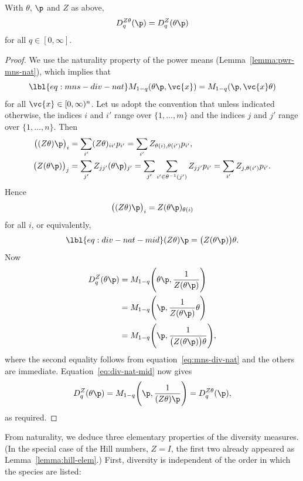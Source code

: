 \begin{lemma}[Naturality]
%
% 
With $\theta$, $\p$ and $Z$ as above,
\[
D_q^{Z\theta}(\p) = D_q^Z(\theta\p)
\]
for all $q \in [0, \infty]$.
\end{lemma}

\begin{proof}
We use the naturality property of the
power means (Lemma~\ref{lemma:pwr-mns-nat}), which implies that
% 
\begin{equation}
\lbl{eq:mns-div-nat}
M_{1 - q}(\theta\p, \vc{x})
=
M_{1 - q}(\p, \vc{x}\theta)
\end{equation}
% 
for all $\vc{x} \in [0, \infty)^n$.  Let us adopt the convention that unless
  indicated otherwise, the indices $i$ and $i'$ range over $\{1, \ldots,
  m\}$ and the indices $j$ and $j'$ range over $\{1, \ldots, n\}$.  Then
% 
\begin{align*}
\bigl( (Z\theta)\p \bigr)_i     &
=
\sum_{i'} (Z\theta)_{ii'} p_{i'} 
=
\sum_{i'} Z_{\theta(i), \theta(i')} p_{i'},     \\
\bigl( Z (\theta\p) \bigr)_j    &
=
\sum_{j'} Z_{jj'} (\theta\p)_{j'}
=
\sum_{j'} \sum_{i' \in \theta^{-1}(j')} Z_{jj'} p_{i'}
=
\sum_{i'} Z_{j, \theta(i')} p_{i'}.
\end{align*}
% 
Hence 
\[
\bigl( (Z\theta) \p \bigr)_i 
=
Z(\theta\p)_{\theta(i)}
\]
for all $i$, or equivalently,
% 
\begin{equation}
\lbl{eq:div-nat-mid}
(Z\theta) \p = \bigl( Z (\theta\p) \bigr) \theta.
\end{equation}
% 
Now
% 
\begin{align*}
D_q^Z(\theta\p) &
=
M_{1 - q}\Biggl(
\theta\p, \frac{1}{Z(\theta\p)}
\Biggr)  \\
&
=
M_{1 - q} \Biggl( 
\p, 
\frac{1}{Z(\theta\p)} \theta    
\Biggr) \\
&
=
M_{1 - q} \Biggl( 
\p, 
\frac{1}{\bigl(Z(\theta\p)\bigr)\theta} 
\Biggr),
\end{align*}
% 
where the second equality follows from equation~\eqref{eq:mns-div-nat} and
the others are immediate.  Equation~\eqref{eq:div-nat-mid} now gives
\[
D_q^Z(\theta\p) 
=
M_{1 - q} \Biggl( \p, \frac{1}{(Z\theta)\p} \Biggr)       
=
D_q^{Z\theta}(\p),
\]
as required.
\end{proof}

From naturality, we deduce three elementary properties of the diversity
measures.  (In the special case of the Hill numbers, $Z = I$, the first two
already appeared as Lemma~\ref{lemma:hill-elem}.)  First, diversity is
independent of the order in which the species are listed:


